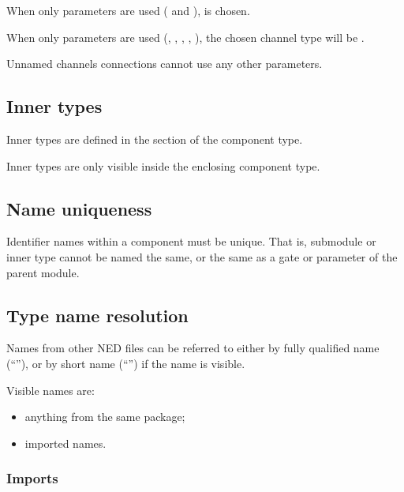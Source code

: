 When only  parameters are used (
and ),  is chosen.

When only  parameters are used
(, , , , ),
the chosen channel type will be .

Unnamed channels connections cannot use any other parameters.



\subsection{Inner types}
\label{ch-ned-ref:sec:inner-types}

Inner types are defined in the  section of the component type.

Inner types are only visible inside the enclosing component type.



\subsection{Name uniqueness}

Identifier names within a component must be unique. That is, submodule
or inner type cannot be named the same, or the same as a gate or
parameter of the parent module.



\subsection{Type name resolution}
\label{ch-ned-ref:sec:type-name-resolution}

Names from other NED files can be referred to either by fully qualified
name (``''), or by short name
(``'') if the name is visible.

Visible names are:

\begin{itemize}
  \item anything from the same package;
  \item imported names.
\end{itemize}

\subsubsection{Imports}

